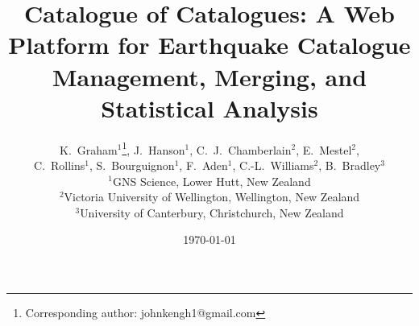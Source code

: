 \documentclass[12pt]{article}
\begin{document}
\title{\textbf{Catalogue of Catalogues}: A Web Platform for Earthquake
  Catalogue Management, Merging, and Statistical Analysis}

\author{
  K.~Graham$^{1}$\thanks{Corresponding author: johnkengh1@gmail.com},\;
  J.~Hanson$^{1}$,\;
  C.~J.~Chamberlain$^{2}$,\;
  E.~Mestel$^{2}$,\\
  C.~Rollins$^{1}$,\;
  S.~Bourguignon$^{1}$,\;
  F.~Aden$^{1}$,\;
  C.-L.~Williams$^{2}$,\;
  B.~Bradley$^{3}$
  \\[6pt]
  \small $^{1}$GNS Science, Lower Hutt, New Zealand \\
  \small $^{2}$Victoria University of Wellington, Wellington, New Zealand \\
  \small $^{3}$University of Canterbury, Christchurch, New Zealand
}

\date{\today}

\maketitle
\end{document}
